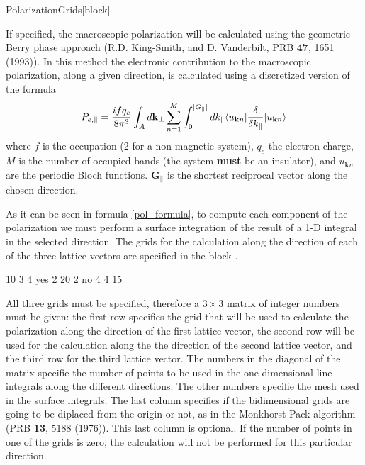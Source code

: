\begin{fdfentry}{PolarizationGrids}[block]

  If specified, the macroscopic polarization will be calculated using
  the geometric Berry phase approach (R.D. King-Smith, and
  D. Vanderbilt, PRB \textbf{47}, 1651 (1993)). In this method the
  electronic contribution to the macroscopic polarization, along a
  given direction, is calculated using a discretized version of the
  formula
  \begin{equation}
    \label{pol_formula}
    P_{e,\parallel}={ifq_e \over 8\pi^3} \int_A d\mathbf{k}_\perp
    \sum_{n=1}^M \int_0^{|G_\parallel|} dk_{\parallel}
    \langle u_{\mathbf{k} n} |{\delta \over \delta k_{\parallel}} |
    u_{\mathbf{k} n} \rangle
  \end{equation}
  where $f$ is the occupation (2 for a non-magnetic system), $q_e$ the
  electron charge, $M$ is the number of occupied bands (the system
  \textbf{must} be an insulator), and $u_{\mathbf{k} n}$ are the
  periodic Bloch functions. $\mathbf{G}_\parallel$ is the shortest
  reciprocal vector along the chosen direction.

  As it can be seen in formula \eqref{pol_formula}, to compute each
  component of the polarization we must perform a surface integration
  of the result of a 1-D integral in the selected direction.  The
  grids for the calculation along the direction of each of the three
  lattice vectors are specified in the block .
  \begin{fdfexample}
        10   3  4      yes
         2  20  2       no
         4   4 15
  \end{fdfexample}

  All three grids must be specified, therefore a $3\times3$ matrix of
  integer numbers must be given: the first row specifies the grid that
  will be used to calculate the polarization along the direction of
  the first lattice vector, the second row will be used for the
  calculation along the the direction of the second lattice vector,
  and the third row for the third lattice vector.  The numbers in the
  diagonal of the matrix specifie the number of points to be used in
  the one dimensional line integrals along the different
  directions. The other numbers specifie the mesh used in the surface
  integrals.  The last column specifies if the bidimensional grids are
  going to be diplaced from the origin or not, as in the
  Monkhorst-Pack algorithm (PRB \textbf{13}, 5188 (1976)).  This last
  column is optional.  If the number of points in one of the grids is
  zero, the calculation will not be performed for this particular
  direction.


\end{fdfentry}
